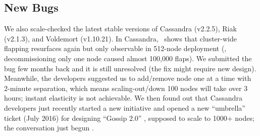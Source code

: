 


\subsection{New Bugs}
\label{eval-new}



We also scale-checked the latest stable versions of Cassandra (v2.2.5),
Riak (v2.1.3), and Voldemort (v1.10.21). 
%
In Cassandra, \sck\ shows that cluster-wide flapping resurfaces again but
only observable in 512-node deployment (\eg, decommissioning only one node
caused almost 100,000 flaps).  We submitted the bug few months back and it
is still unresolved (the fix might require new design).
%
Meanwhile, the developers suggested us to add/remove node one at a time
with 2-minute separation, which means scaling-out/down 100 nodes will take
over 3 hours; instant elasticity is not achievable.
%
We then found out that Cassandra developers just recently started a new
initiative and opened a new ``umbrella'' ticket (July 2016) for designing
``Gossip 2.0'' \cite{Gossip20}, supposed to scale to
1000+ nodes; the conversation just begun \cite{Gossip20Mail}.
%
%


\fi

